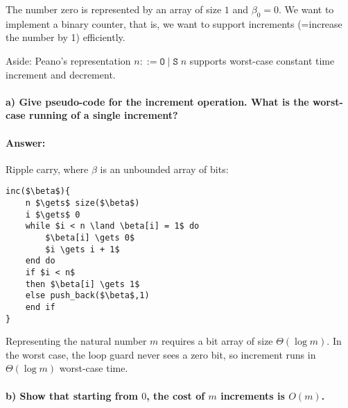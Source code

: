 \documentclass[a4paper]{article}
\begin{document}
\noindent The number zero is represented by an array of size $1$ and $\beta_0 = 0$. We want to implement a binary counter, that is, we want to support increments (=increase the number by 1) efficiently.

Aside:
Peano's representation $n ::= \texttt{O} \mid \texttt{S}\;n$ supports worst-case constant time increment and decrement.

\paragraph{a) Give pseudo-code for the increment operation. What is the worst-case running of a single increment?}

\paragraph{Answer:}
Ripple carry, where $\beta$ is an unbounded array of bits:
\begin{lstlisting}[mathescape,xleftmargin=2cm]
inc($\beta$){
    n $\gets$ size($\beta$)
    i $\gets$ 0
    while $i < n \land \beta[i] = 1$ do
        $\beta[i] \gets 0$
        $i \gets i + 1$
    end do
    if $i < n$
    then $\beta[i] \gets 1$
    else push_back($\beta$,1)
    end if
}
\end{lstlisting}
Representing the natural number $m$ requires a bit array of size $\Theta(\log m)$.
In the worst case, the loop guard never sees a zero bit, so increment runs in $\Theta(\log m)$ worst-case time.

\paragraph{b) Show that starting from $0$, the cost of $m$ increments is $O(m)$.}
\end{document}
